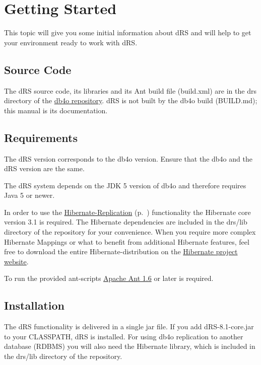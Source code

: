 
\chapter{Getting Started}
\label{drs:db4o-replication-system-drs-getting-started}

This topic will give you some initial information about dRS and will help to get your environment ready to work with dRS.

\section*{Source Code}

The dRS source code, its libraries and its Ant build file (build.xml) are in the drs directory of the \href{https://github.com/blakemcbride/db4o}{db4o repository}. dRS is not built by the db4o build (BUILD.md); this manual is its documentation.

\section*{Requirements}

The dRS version corresponds to the db4o version. Ensure that the db4o and the dRS version are the same.

The dRS system depends on the JDK 5 version of db4o and therefore requires Java 5 or newer.

In order to use the \hyperref[drs:db4o-replication-system-drs-replication-with-rdbms]{Hibernate-Replication} (p.~\pageref{drs:db4o-replication-system-drs-replication-with-rdbms}) functionality the Hibernate core version 3.1 is required. The Hibernate dependencies are included in the drs/lib directory of the repository for your convenience. When you require more complex Hibernate Mappings or what to benefit from additional Hibernate features, feel free to download the entire Hibernate-distribution on the \href{http://www.hibernate.org/}{Hibernate project website}.

To run the provided ant-scripts \href{http://ant.apache.org/}{Apache Ant 1.6} or later is required.

\section*{Installation}

The dRS functionality is delivered in a single jar file. If you add dRS-8.1-core.jar to your CLASSPATH, dRS is installed. For using db4o replication to another database (RDBMS) you will also need the Hibernate library, which is included in the drs/lib directory of the repository.

